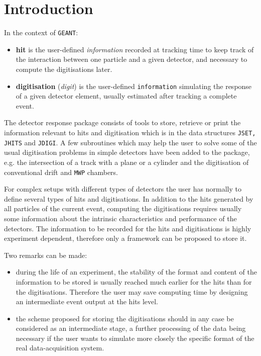          
         
\section{Introduction}
In the context of {\tt GEANT}:
\begin{itemize}
\item {\bf hit} is the user-defined {\it information} recorded at 
tracking time to keep track of the interaction between one
particle and a given detector,
and necessary to compute the digitisations later.
\item  {\bf digitisation} ({\it digit}) is the user-defined
{\tt information} simulating the response
of a given detector element, usually estimated
after tracking a complete event.
\end{itemize}
The detector response package consists of tools to store,
retrieve or print the information relevant to hits and
digitisation which is in the data structures
{\tt JSET, JHITS} and {\tt JDIGI}.
A few subroutines which may
help the user to solve some of the usual digitisation problems
in simple detectors
have been added to the package, e.g. the intersection of a
track with a plane or a cylinder
and the digitisation of conventional drift and {\tt MWP} chambers.

For complex setups with different types of detectors
the user has normally to define
several types of hits and digitisations.
In addition to the hits generated by all particles of the
current event, computing the digitisations
requires usually some information about the intrinsic
characteristics and performance of the detectors.
The information to be recorded for the hits and digitisations
is highly experiment dependent, therefore only a framework
can be proposed to store it.
 
Two remarks can be made:
\begin{itemize}
\item during the life of an experiment, 
the stability of the format and content of the information to be stored
is usually reached much earlier for the hits than for the digitisations.
Therefore the user may save computing time
by designing an intermediate event output at the hits level.
\item  the scheme proposed for storing the digitisations
should in any case be considered as
an intermediate stage, a further processing of the data being necessary
if the user wants to
simulate more closely the specific format of the real
data-acquisition system.
\end{itemize}

